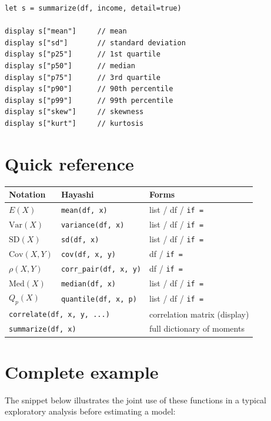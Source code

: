 \begin{lstlisting}[caption={summarize with detail}]
let s = summarize(df, income, detail=true)

display s["mean"]     // mean
display s["sd"]       // standard deviation
display s["p25"]      // 1st quartile
display s["p50"]      // median
display s["p75"]      // 3rd quartile
display s["p90"]      // 90th percentile
display s["p99"]      // 99th percentile
display s["skew"]     // skewness
display s["kurt"]     // kurtosis
\end{lstlisting}

\section{Quick reference}

\begin{center}
\begin{tabular}{lll}
\toprule
\textbf{Notation} & \textbf{Hayashi} & \textbf{Forms} \\
\midrule
$E(X)$
  & \lstinline{mean(df, x)}
  & list / df / \lstinline{if =} \\
$\mathrm{Var}(X)$
  & \lstinline{variance(df, x)}
  & list / df / \lstinline{if =} \\
$\mathrm{SD}(X)$
  & \lstinline{sd(df, x)}
  & list / df / \lstinline{if =} \\
$\mathrm{Cov}(X, Y)$
  & \lstinline{cov(df, x, y)}
  & df / \lstinline{if =} \\
$\rho(X, Y)$
  & \lstinline{corr_pair(df, x, y)}
  & df / \lstinline{if =} \\
$\mathrm{Med}(X)$
  & \lstinline{median(df, x)}
  & list / df / \lstinline{if =} \\
$Q_p(X)$
  & \lstinline{quantile(df, x, p)}
  & list / df / \lstinline{if =} \\
\midrule
\multicolumn{2}{l}{\lstinline{correlate(df, x, y, ...)}}
  & correlation matrix (display) \\
\multicolumn{2}{l}{\lstinline{summarize(df, x)}}
  & full dictionary of moments \\
\bottomrule
\end{tabular}
\end{center}

\section{Complete example}

The snippet below illustrates the joint use of these functions in a typical
exploratory analysis before estimating a model:

